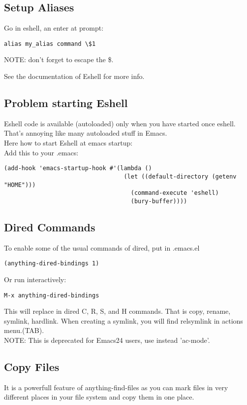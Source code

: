 \documentclass[a4paper,11pt]{article}
\begin{document}
\subsection{Setup Aliases}
\label{sec:setup-aliases}
Go in eshell, an enter at prompt:
\begin{verbatim}
alias my_alias command \$1
\end{verbatim}
NOTE: don't forget to escape the \$.

See the documentation of Eshell for more info.

\subsection{Problem starting Eshell}
\label{sec:probl-start-eshell}
Eshell code is available (autoloaded) only when you have started once eshell.
That's annoying like many autoloaded stuff in Emacs.\\

Here how to start Eshell at emacs startup:\\

Add this to your .emacs:
\begin{verbatim}
(add-hook 'emacs-startup-hook #'(lambda ()
                                  (let ((default-directory (getenv "HOME")))
                                    (command-execute 'eshell)
                                    (bury-buffer))))

\end{verbatim}
 
\subsection{Dired Commands}
\label{sec:dired-commands}
To enable some of the usual commands of dired, put in .emacs.el
\begin{verbatim}
(anything-dired-bindings 1)
\end{verbatim}
Or run interactively:
\begin{verbatim}
M-x anything-dired-bindings
\end{verbatim}
This will replace in dired C, R, S, and H commands.
That is copy, rename, symlink, hardlink.
When creating a symlink, you will find relsymlink in actions menu.(TAB).\\
NOTE: This is deprecated for Emacs24 users, use instead 'ac-mode'.

\subsection{Copy Files}
\label{sec:copy-files}
It is a powerfull feature of anything-find-files as you can mark files in very different places in your
file system and copy them in one place.
\end{document}

